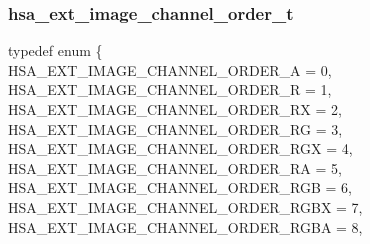 \documentclass[final,oneside]{book}
\newcommand{\reftyp}[1]{#1}
\newcommand{\refenu}[1]{\reftyp{#1}}
\newenvironment{mylongtable}{\rowcolors{0}{lightgray}{lightgray}\longtable} {
\endlongtable}
\begin{document}
\subsubsection{hsa_\-ext_\-image_\-channel_\-order_\-t}
\vspace{-5.5mm}\begin{mylongtable}{@{}p{\textwidth}}
\rule{0pt}{3ex}typedef enum \{\\\hspace{1.7em}\hypertarget{group__ext-images_1ggabaced4fb1f3b9fdaa978e143af5ff055aa68ce325d9662ff1a1c78598835c8d55}{\refenu{HSA_\-EXT_\-IMAGE_\-CHANNEL_\-ORDER_\-A}} = 0,\\
\hspace{1.7em}\hypertarget{group__ext-images_1ggabaced4fb1f3b9fdaa978e143af5ff055ae6f5e256120da86e073db6a996e778d7}{\refenu{HSA_\-EXT_\-IMAGE_\-CHANNEL_\-ORDER_\-R}} = 1,\\
\hspace{1.7em}\hypertarget{group__ext-images_1ggabaced4fb1f3b9fdaa978e143af5ff055ad22499f0285b97596caa1a316f839ace}{\refenu{HSA_\-EXT_\-IMAGE_\-CHANNEL_\-ORDER_\-RX}} = 2,\\
\hspace{1.7em}\hypertarget{group__ext-images_1ggabaced4fb1f3b9fdaa978e143af5ff055a49185aef99188ff46b53d4da23614798}{\refenu{HSA_\-EXT_\-IMAGE_\-CHANNEL_\-ORDER_\-RG}} = 3,\\
\hspace{1.7em}\hypertarget{group__ext-images_1ggabaced4fb1f3b9fdaa978e143af5ff055a59e32fe3e15c24a407c5f1e56a6935f4}{\refenu{HSA_\-EXT_\-IMAGE_\-CHANNEL_\-ORDER_\-RGX}} = 4,\\
\hspace{1.7em}\hypertarget{group__ext-images_1ggabaced4fb1f3b9fdaa978e143af5ff055a7ec545d6291f17a9a779b6f673fad718}{\refenu{HSA_\-EXT_\-IMAGE_\-CHANNEL_\-ORDER_\-RA}} = 5,\\
\hspace{1.7em}\hypertarget{group__ext-images_1ggabaced4fb1f3b9fdaa978e143af5ff055ae3d2eed3398c973eab1e66e1b92a8efe}{\refenu{HSA_\-EXT_\-IMAGE_\-CHANNEL_\-ORDER_\-RGB}} = 6,\\
\hspace{1.7em}\hypertarget{group__ext-images_1ggabaced4fb1f3b9fdaa978e143af5ff055a3d93bdf6b20f6409a9d684646908bfe1}{\refenu{HSA_\-EXT_\-IMAGE_\-CHANNEL_\-ORDER_\-RGBX}} = 7,\\
\hspace{1.7em}\hypertarget{group__ext-images_1ggabaced4fb1f3b9fdaa978e143af5ff055a0c5e8dc0eef9af781786ef67ee3702df}{\refenu{HSA_\-EXT_\-IMAGE_\-CHANNEL_\-ORDER_\-RGBA}} = 8,\\

\end{mylongtable}
\end{document}
